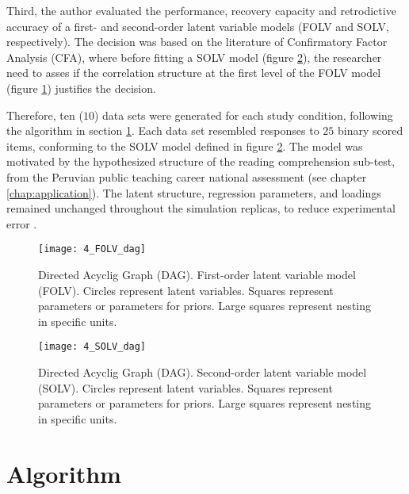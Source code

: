 Third, the author evaluated the performance, recovery capacity and retrodictive accuracy of a first- and second-order latent variable models (FOLV and SOLV, respectively). The decision was based on the literature of Confirmatory Factor Analysis (CFA), where before fitting a SOLV model (figure \ref{fig:SOLV_model}), the researcher need to asses if the correlation structure at the first level of the FOLV model (figure \ref{fig:FOLV_model}) justifies the decision.

Therefore, ten ($10$) data sets were generated for each study condition, following the algorithm in section \ref{sect:algorithm}. Each data set resembled responses to $25$ binary scored items, conforming to the SOLV model defined in figure \ref{fig:SOLV_model}. The model was motivated by the hypothesized structure of the reading comprehension sub-test, from the Peruvian public teaching career national assessment (see chapter \ref{chap:application}). The latent structure, regression parameters, and loadings remained unchanged throughout the simulation replicas, to reduce experimental error \cite{Kieftenbeld_et_al_2012}. 
%
\begin{figure}[h]
	\centering
	\texttt{[image: 4\_FOLV\_dag]}
	\caption[Directed Acyclig Graph (DAG). First-order latent variable model (FOLV).]%
	{Directed Acyclig Graph (DAG). First-order latent variable model (FOLV). Circles represent latent variables. Squares represent parameters or parameters for priors. Large squares represent nesting in specific units.}
	\label{fig:FOLV_model}
\end{figure}
%
\begin{figure}[h]
	\centering
	\texttt{[image: 4\_SOLV\_dag]}
	\caption[Directed Acyclic Graph (DAG). Second-order latent variable model (SOLV).]%
	{Directed Acyclig Graph (DAG). Second-order latent variable model (SOLV). Circles represent latent variables. Squares represent parameters or parameters for priors. Large squares represent nesting in specific units.}
	\label{fig:SOLV_model}
\end{figure}


\section{Algorithm} \label{sect:algorithm}

